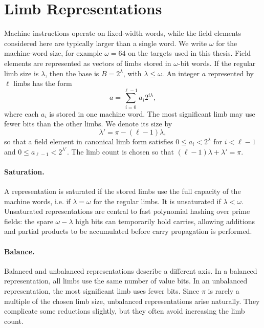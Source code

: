 \section{Limb Representations}
\label{sec:limb-representations}

Machine instructions operate on fixed-width words, while the field elements considered here are typically larger than a single word. We write \(\omega\) for the machine-word size, for example \(\omega=64\) on the targets used in this thesis. Field elements are represented as vectors of limbs stored in \(\omega\)-bit words. If the regular limb size is \(\lambda\), then the base is \(B=2^\lambda\), with \(\lambda \leq \omega\). An integer \(a\) represented by \(\ell\) limbs has the form
\[
    a = \sum_{i=0}^{\ell-1} a_i 2^{i\lambda},
\]
where each \(a_i\) is stored in one machine word. The most significant limb may use fewer bits than the other limbs. We denote its size by
\[
    \lambda' = \pi - (\ell-1)\lambda,
\]
so that a field element in canonical limb form satisfies \(0 \leq a_i < 2^\lambda\) for \(i<\ell-1\) and \(0 \leq a_{\ell-1} < 2^{\lambda'}\). The limb count is chosen so that \((\ell-1)\lambda+\lambda'=\pi\).

\paragraph{Saturation.}
A representation is saturated if the stored limbs use the full capacity of the machine words, i.e. if \(\lambda=\omega\) for the regular limbs. It is unsaturated if \(\lambda<\omega\). Unsaturated representations are central to fast polynomial hashing over prime fields: the spare \(\omega-\lambda\) high bits can temporarily hold carries, allowing additions and partial products to be accumulated before carry propagation is performed.

\paragraph{Balance.}
Balanced and unbalanced representations describe a different axis. In a balanced representation, all limbs use the same number of value bits. In an unbalanced representation, the most significant limb uses fewer bits. Since \(\pi\) is rarely a multiple of the chosen limb size, unbalanced representations arise naturally. They complicate some reductions slightly, but they often avoid increasing the limb count.

